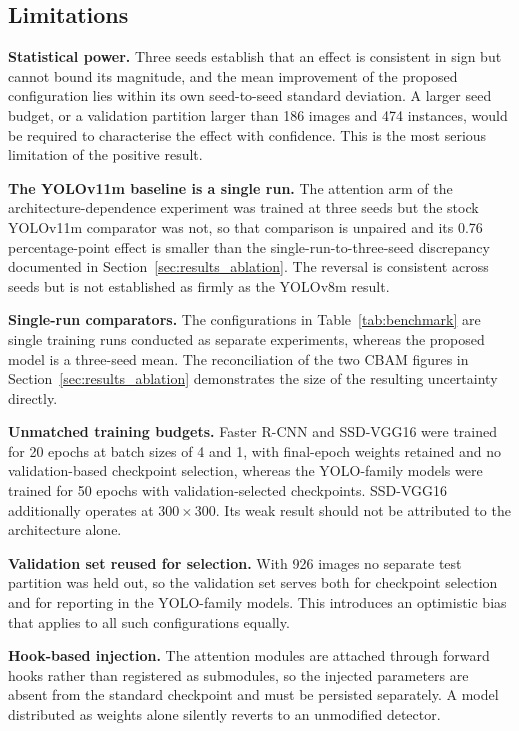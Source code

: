 \documentclass[MScCS]{uccthesis}
\begin{document}
\subsection{Limitations}
\label{sec:disc_limitations}

\textbf{Statistical power.} Three seeds establish that an effect is consistent
in sign but cannot bound its magnitude, and the mean improvement of the
proposed configuration lies within its own seed-to-seed standard deviation. A
larger seed budget, or a validation partition larger than 186 images and 474
instances, would be required to characterise the effect with confidence. This
is the most serious limitation of the positive result.

\textbf{The YOLOv11m baseline is a single run.} The attention arm of the
architecture-dependence experiment was trained at three seeds but the stock
YOLOv11m comparator was not, so that comparison is unpaired and its 0.76
percentage-point effect is smaller than the single-run-to-three-seed
discrepancy documented in Section~\ref{sec:results_ablation}. The reversal is
consistent across seeds but is not established as firmly as the YOLOv8m
result.

\textbf{Single-run comparators.} The configurations in
Table~\ref{tab:benchmark} are single training runs conducted as separate
experiments, whereas the proposed model is a three-seed mean. The reconciliation
of the two CBAM figures in Section~\ref{sec:results_ablation} demonstrates the
size of the resulting uncertainty directly.

\textbf{Unmatched training budgets.} Faster R-CNN and SSD-VGG16 were trained
for 20 epochs at batch sizes of 4 and 1, with final-epoch weights retained and
no validation-based checkpoint selection, whereas the YOLO-family models were
trained for 50 epochs with validation-selected checkpoints. SSD-VGG16
additionally operates at $300 \times 300$. Its weak result should not be
attributed to the architecture alone.

\textbf{Validation set reused for selection.} With 926 images no separate test
partition was held out, so the validation set serves both for checkpoint
selection and for reporting in the YOLO-family models. This introduces an
optimistic bias that applies to all such configurations equally.

\textbf{Hook-based injection.} The attention modules are attached through
forward hooks rather than registered as submodules, so the injected parameters
are absent from the standard checkpoint and must be persisted separately. A
model distributed as weights alone silently reverts to an unmodified detector.
\end{document}

